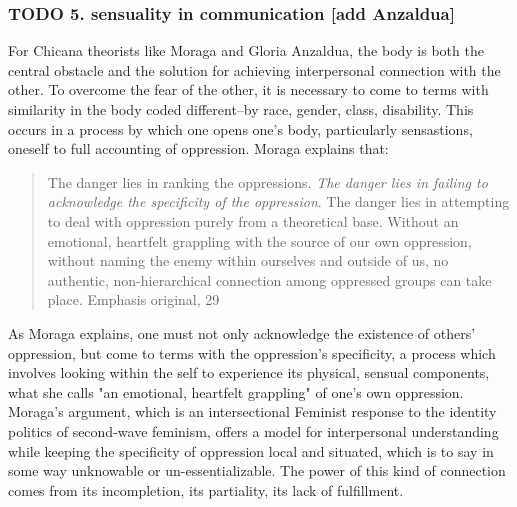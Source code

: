 \documentclass[11pt]{article}
\begin{document}
\subsubsection{{\bfseries\sffamily TODO} 5. sensuality in communication [add Anzaldua]}
\label{sec:orgca66d16}
For Chicana theorists like Moraga and Gloria Anzaldua, the body is
both the central obstacle and the solution for achieving interpersonal
connection with the other. To overcome the fear of the other, it is
necessary to come to terms with similarity in the body coded
different--by race, gender, class, disability. This occurs in a
process by which one opens one's body, particularly sensastions,
oneself to full accounting of oppression. Moraga explains that:
\begin{quote}
The danger lies in ranking the oppressions. \emph{The danger lies in
failing to acknowledge the specificity of the oppression}. The danger
lies in attempting to deal with oppression purely from a theoretical
base. Without an emotional, heartfelt grappling with the source of our
own oppression, without naming the enemy within ourselves and outside
of us, no authentic, non-hierarchical connection among oppressed
groups can take place. Emphasis original, 29
\end{quote}
As Moraga explains, one must not only acknowledge the existence of
others' oppression, but come to terms with the oppression's
specificity, a process which involves looking within the self to
experience its physical, sensual components, what she calls "an
emotional, heartfelt grappling" of one's own oppression. Moraga's
argument, which is an intersectional Feminist response to the identity
politics of second-wave feminism, offers a model for interpersonal
understanding while keeping the specificity of oppression local and
situated, which is to say in some way unknowable or
un-essentializable. The power of this kind of connection comes from
its incompletion, its partiality, its lack of fulfillment. 
\end{document}
